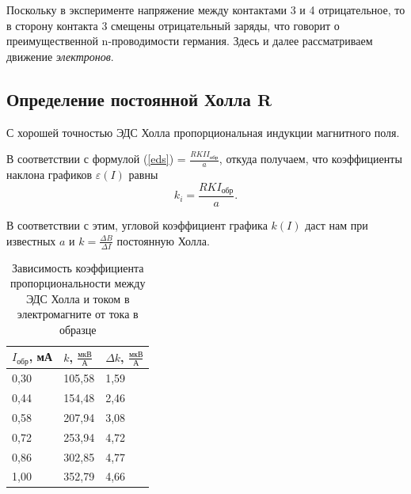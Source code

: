 \documentclass[a4paper, 12pt]{article}
\begin{document}
{Поскольку в эксперименте напряжение между контактами 3 и 4 отрицательное, то в сторону контакта 3 смещены отрицательный заряды, что говорит о преимущественной n-проводимости германия. Здесь и далее рассматриваем движение \textit{электронов}.

\subsection*{Определение постоянной Холла $\mathbf{R}$}
С хорошей точностью ЭДС Холла пропорциональная индукции магнитного поля.

В соответствии с формулой (\ref{eds}) = $\frac{RKII_\text{обр}}{a}$, откуда получаем, что коэффициенты наклона графиков $\varepsilon(I)$ равны 
$$ k_i  = \frac{RKI_\text{обр}}{a}.$$

В соответствии с этим, угловой коэффициент графика $k(I)$ даст нам при известных $a$ и $k = \frac{\Delta B}{\Delta I}$ постоянную Холла.

\begin{table}[H]
\centering
\begin{tabular}{|l|l|l|}
\hline
\textbf{$I_\text{обр}$, мА} & \textbf{$k$, $\frac{\text{мкВ}}{\text{А}}$} & \textbf{$\Delta k$, $\frac{\text{мкВ}}{\text{А}}$} \\ \hline
0,30                        & 105,58                                      & 1,59                                               \\ \hline
0,44                        & 154,48                                      & 2,46                                               \\ \hline
0,58                        & 207,94                                      & 3,08                                               \\ \hline
0,72                        & 253,94                                      & 4,72                                               \\ \hline
0,86                        & 302,85                                      & 4,77                                               \\ \hline
1,00                        & 352,79                                      & 4,66                                               \\ \hline
\end{tabular}
\caption{Зависимость коэффициента пропорциональности между ЭДС Холла и током в электромагните от тока в образце}
\label{my-label}
\end{table}

}
\end{document}
